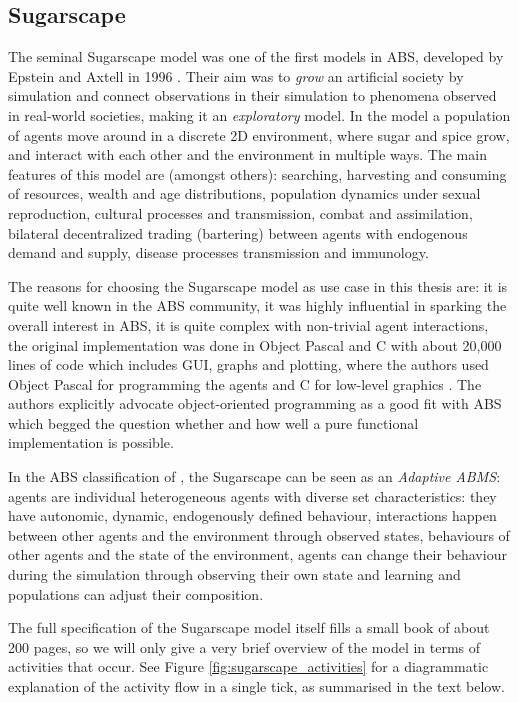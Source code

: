 \subsection{Sugarscape}
\label{sec:sugarscape}

The seminal Sugarscape model was one of the first models in ABS, developed by Epstein and Axtell in 1996 \cite{epstein_growing_1996}. Their aim was to \textit{grow} an artificial society by simulation and connect observations in their simulation to phenomena observed in real-world societies, making it an \textit{exploratory} model. In the model a population of agents move around in a discrete 2D environment, where sugar and spice grow, and interact with each other and the environment in multiple ways. The main features of this model are (amongst others): searching, harvesting and consuming of resources, wealth and age distributions, population dynamics under sexual reproduction, cultural processes and transmission, combat and assimilation, bilateral decentralized trading (bartering) between agents with endogenous demand and supply, disease processes transmission and immunology.

The reasons for choosing the Sugarscape model as use case in this thesis are: it is quite well known in the ABS community, it was highly influential in sparking the overall interest in ABS, it is quite complex with non-trivial agent interactions, the original implementation was done in Object Pascal and C with about 20,000 lines of code which includes GUI, graphs and plotting, where the authors used Object Pascal for programming the agents and C for low-level graphics \cite{axtell_aligning_1996}. The authors explicitly advocate object-oriented programming as a good fit with ABS which begged the question whether and how well a pure functional implementation is possible. 

In the ABS classification of \cite{macal_everything_2016}, the Sugarscape can be seen as an \textit{Adaptive ABMS}: agents are individual heterogeneous agents with diverse set characteristics: they have autonomic, dynamic, endogenously defined behaviour, interactions happen between other agents and the environment through observed states, behaviours of other agents and the state of the environment, agents can change their behaviour during the simulation through observing their own state and learning and populations can adjust their composition.

The full specification of the Sugarscape model itself fills a small book of about 200 pages, so we will only give a very brief overview of the model in terms of activities that occur. See Figure \ref{fig:sugarscape_activities} for a diagrammatic explanation of the activity flow in a single tick, as summarised in the text below.

